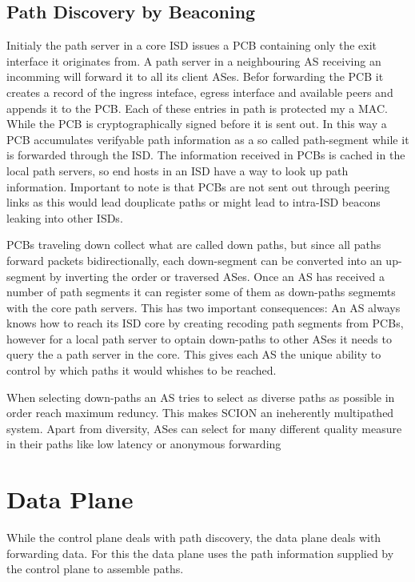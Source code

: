 \documentclass[../eva1_scion.tex]{subfiles}
\begin{document}
    \subsection{Path Discovery by Beaconing}\label{ssec:beaconing}
    Initialy the path server in a core ISD issues a PCB containing only the exit interface it originates from. A path server in a neighbouring AS receiving an incomming will forward it to all its client ASes. Befor forwarding the PCB it creates a  record of the ingress inteface, egress interface and available peers and appends it to the PCB. Each of these entries in path is protected my a MAC. While the PCB is cryptographically signed before it is sent out. In this way a PCB accumulates verifyable path information as a so called path-segment while it is forwarded through the ISD. The information received in PCBs is cached in the local path servers, so end hosts in an ISD have a way to look up path information. Important to note is that PCBs are not sent out through peering links as this would lead douplicate paths or might lead to intra-ISD beacons leaking into other ISDs.

    PCBs traveling down collect what are called down paths, but since all paths forward packets bidirectionally, each down-segment can be converted into an up-segment by inverting the order or traversed ASes. Once an AS has received a number of path segments it can register some of them as down-paths segmemts with the core path servers. This has two important consequences:  An AS always knows how to reach its ISD core by creating recoding path segments from PCBs, however for a local path server to optain down-paths to other ASes it needs to query the a path server in the core. This gives each AS the unique ability to control by which paths it would whishes to be reached.

    When selecting down-paths an AS tries to select as diverse paths as possible in order reach maximum reduncy. This makes SCION an ineherently multipathed system. Apart from diversity, ASes can select for many different quality measure in their paths like low latency or anonymous forwarding

    \section{Data Plane}
    While the control plane deals with path discovery, the data plane deals with forwarding data. For this the data plane uses the path information supplied by the control plane to assemble paths.
\end{document}
